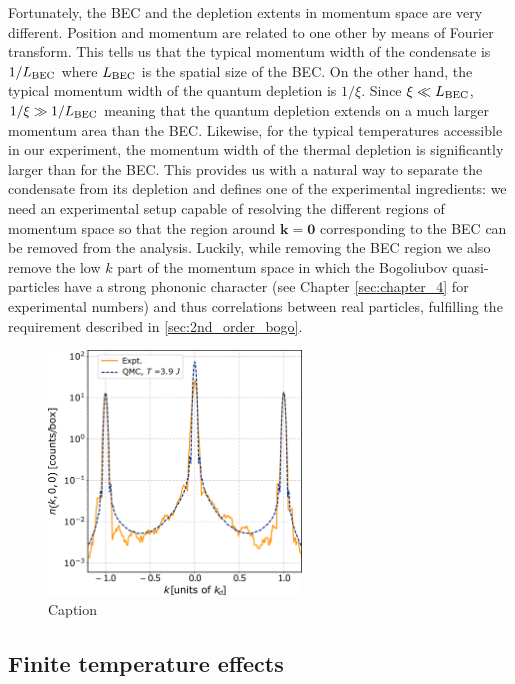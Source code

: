 Fortunately, the BEC and the depletion extents in momentum space are very different. Position and momentum are related to one other by means of Fourier transform. This tells us that the typical momentum width of the condensate is $1/L_{\rm{BEC}}$ \cite{stenger1999} where $L_{\rm{BEC}}$ is the spatial size of the BEC. On the other hand, the typical momentum width of the quantum depletion is $1/\xi$. Since $\xi \ll L_{\rm{BEC}}$, $1/\xi \gg 1/L_{\rm{BEC}}$ meaning that the quantum depletion extends on a much larger momentum area than the BEC. Likewise, for the typical temperatures accessible in our experiment, the momentum width of the thermal depletion is significantly larger than for the BEC. This provides us with a natural way to separate the condensate from its depletion and defines one of the experimental ingredients: we need an experimental setup capable of resolving the different regions of momentum space so that the region around $\bm{k}=\bm{0}$ corresponding to the BEC can be removed from the analysis. Luckily, while removing the BEC region we also remove the low $k$ part of the momentum space in which the Bogoliubov quasi-particles have a strong phononic character (see Chapter \ref{sec:chapter_4} for experimental numbers) and thus \kmk correlations between real particles, fulfilling the requirement described in \ref{sec:2nd_order_bogo}.

\begin{figure}
    \centering
    \includegraphics[width=0.6\textwidth]{Fig/Chapter1/cayla_2018.png}
    \caption{Caption}
    \label{fig:my_label}
\end{figure}


\subsection{Finite temperature effects}

